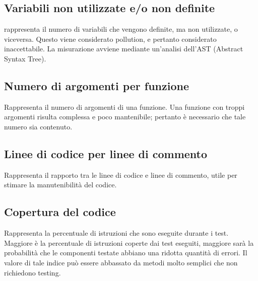   \subsection{Variabili non utilizzate e/o non definite}
  rappresenta il numero di variabili che vengono definite, ma non utilizzate, o viceversa.
  Questo viene considerato pollution, e pertanto considerato inaccettabile.
  La misurazione avviene mediante un’analisi dell’AST (Abstract Syntax Tree).

  \subsection{Numero di argomenti per funzione}
  Rappresenta il numero di argomenti di una funzione. Una funzione con troppi argomenti
  risulta complessa e poco mantenibile; pertanto è necessario che tale numero sia contenuto.

  \subsection{Linee di codice per linee di commento}
  Rappresenta il rapporto tra le linee di codice e linee di commento, utile per stimare la manutenibilità del codice.

  \subsection{Copertura del codice}
  Rappresenta la percentuale di istruzioni che sono eseguite durante i test. Maggiore è la percentuale di istruzioni coperte dai test eseguiti, maggiore sarà la probabilità
  che le componenti testate abbiano una ridotta quantità di errori. Il valore di tale indice può essere abbassato da metodi molto semplici che non richiedono testing.
